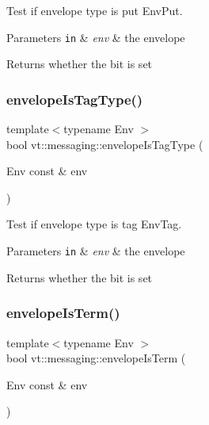 Test if envelope type is put {\ttfamily Env\+Put}. 


\begin{DoxyParams}[1]{Parameters}
\mbox{\tt in}  & {\em env} & the envelope\\
\hline
\end{DoxyParams}
\begin{DoxyReturn}{Returns}
whether the bit is set 
\end{DoxyReturn}
\mbox{\label{namespacevt_1_1messaging_a210f23c991eaf84274b744ac109ba72d}} 
\subsubsection{\texorpdfstring{envelope\+Is\+Tag\+Type()}{envelopeIsTagType()}}
{\footnotesize\ttfamily template$<$typename Env $>$ \\
bool vt\+::messaging\+::envelope\+Is\+Tag\+Type (\begin{DoxyParamCaption}\item[{Env const \&}]{env }\end{DoxyParamCaption})\hspace{0.3cm}{\ttfamily [inline]}}



Test if envelope type is tag {\ttfamily Env\+Tag}. 


\begin{DoxyParams}[1]{Parameters}
\mbox{\tt in}  & {\em env} & the envelope\\
\hline
\end{DoxyParams}
\begin{DoxyReturn}{Returns}
whether the bit is set 
\end{DoxyReturn}
\mbox{\label{namespacevt_1_1messaging_ad1743de9163dc74a43e6a95e28f49462}} 
\subsubsection{\texorpdfstring{envelope\+Is\+Term()}{envelopeIsTerm()}}
{\footnotesize\ttfamily template$<$typename Env $>$ \\
bool vt\+::messaging\+::envelope\+Is\+Term (\begin{DoxyParamCaption}\item[{Env const \&}]{env }\end{DoxyParamCaption})\hspace{0.3cm}{\ttfamily [inline]}}



